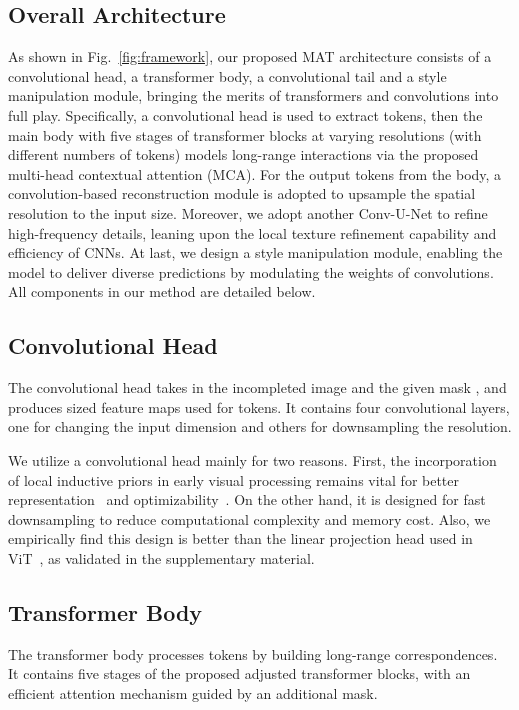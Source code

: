 \documentclass[10pt,twocolumn,letterpaper]{article}
\begin{document}
	\subsection{Overall Architecture}
	\label{sec:arc}
	As shown in Fig.~\ref{fig:framework}, our proposed MAT architecture consists of a convolutional head, a transformer body, a convolutional tail and a style manipulation module, bringing the merits of transformers and convolutions into full play. Specifically, a convolutional head is used to extract tokens, then the main body with five stages of transformer blocks at varying resolutions (with different numbers of tokens) models long-range interactions via the proposed multi-head contextual attention (MCA). For the output tokens from the body, a convolution-based reconstruction module is adopted to upsample the spatial resolution to the input size. Moreover, we adopt another Conv-U-Net to refine high-frequency details, leaning upon the local texture refinement capability and efficiency of CNNs. At last, we design a style manipulation module, enabling the model to deliver diverse predictions by modulating the weights of convolutions. All components in our method are detailed below.
	








	\subsection{Convolutional Head}
	
	The convolutional head takes in the incompleted image  and the given mask , and produces  sized feature maps used for tokens. It contains four convolutional layers, one for changing the input dimension and others for downsampling the resolution.
	
	We utilize a convolutional head mainly for two reasons. First, the incorporation of local inductive priors in early visual processing remains vital for better representation~\cite{raghu2021vision} and optimizability~\cite{xiao2021early}. On the other hand, it is designed for fast downsampling to reduce computational complexity and memory cost. Also, we empirically find this design is better than the linear projection head used in ViT~\cite{dosovitskiy2020image}, as validated in the supplementary material. 
	
	\subsection{Transformer Body}
	The transformer body processes tokens by building long-range correspondences. It contains five stages of the proposed adjusted transformer blocks, with an efficient attention mechanism guided by an additional mask.
	
\end{document}
